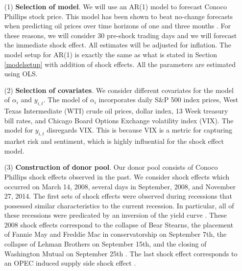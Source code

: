 \documentclass[11pt]{article}
\theoremstyle{definition}
\begin{document}
\begin{enumerate}
\item[(1)] {\bf Selection of model}. We will use an AR(1) model to forecast Conoco Phillips stock price. This model has been shown to beat no-change forecasts when predicting oil prices over time horizons of one and three months \citep{alquist2013forecasting}.  For these reasons, we will consider 30 pre-shock trading days and we will forecast the immediate shock effect. All estimates will be adjusted for inflation. The model setup for AR(1) is exactly the same as what is stated in Section \ref{modelsetup} with addition of shock effects. All the parameters are estimated using OLS.
\item[(2)] {\bf Selection of covariates}. We consider different covariates for the model of $\alpha_i$ and $y_{i, t}$. The model of $\alpha_i$ incorporates daily S\&P 500 index prices, West Texas Intermediate (WTI) crude oil prices, dollar index, 13 Week treasury bill rates, and Chicago Board Options Exchange volatility index (VIX). The model for $y_{i,t}$ disregards VIX. This is because VIX is a metric for capturing market risk and sentiment, which is highly influential for the shock effect model.
\item[(3)] {\bf Construction of donor pool}. Our donor pool consists of Conoco Phillips shock effects observed in the past. We consider shock effects which occurred on March 14, 2008, several days in September, 2008, and November 27, 2014. The first sets of shock effects were observed during recessions that possessed similar characteristics to the current recession. In particular, all of these recessions were predicated by an inversion of the yield curve \citep{bauer2018economic}. These 2008 shock effects correspond to the collapse of Bear Stearns, the placement of Fannie May and Freddie Mac in conservatorship on September 7th, the collapse of Lehman Brothers on September 15th, and the closing of Washington Mutual on September 25th \citep{shorter2008bear, ewing2013volatility, dwyer2009financial, longstaff2010subprime}. The last shock effect corresponds to an OPEC induced supply side shock effect \citep{huppmann2015opec}. %

\end{enumerate}
\end{document}
